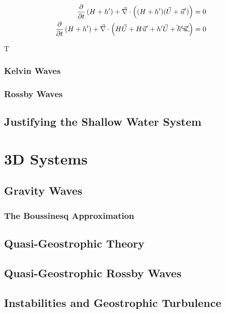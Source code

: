 \begin{align*}
    \frac{\partial}{\partial t}\left( H+h' \right)+\vec{\nabla}\cdot \left( (H+h')(\vec{U}+\vec{u}') \right)=0\\
    \frac{\partial}{\partial t}\left( H+h' \right)+\vec{\nabla}\cdot \left( H\vec{U}+H\vec{u}'+h'\vec{U}+\bcancel{h'\vec{u}'} \right)=0\\
\end{align*}

T


\subsection{Kelvin Waves}

\subsection{Rossby Waves}

\section{Justifying the Shallow Water System}\label{SW Justification}

\chapter{3D Systems}

\section{Gravity Waves}

\subsection{The Boussinesq Approximation}

\section{Quasi-Geostrophic Theory}

\section{Quasi-Geostrophic Rossby Waves}

\section{Instabilities and Geostrophic Turbulence}

